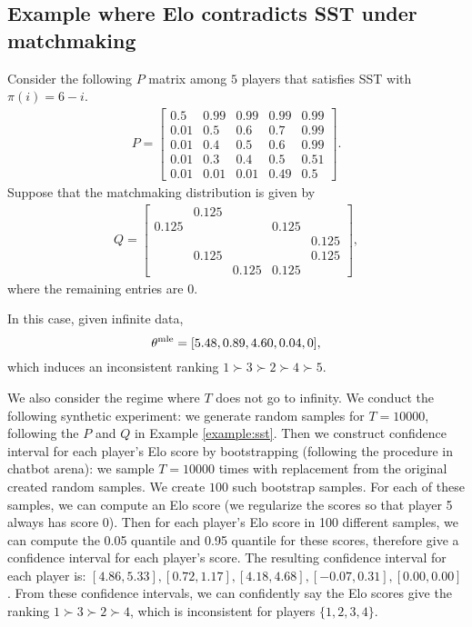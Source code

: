 \subsection{Example where Elo contradicts SST under matchmaking}
\begin{example}
\label{example:sst}
Consider the following $P$ matrix among $5$ players that satisfies SST with $\pi(i)=6-i$.
\begin{align*}
P=\left[
\begin{matrix}
0.5 & 0.99 & 0.99 & 0.99 & 0.99\\
0.01 & 0.5 & 0.6 & 0.7 & 0.99 \\
0.01 & 0.4 & 0.5 & 0.6 & 0.99 \\
0.01 & 0.3& 0.4 & 0.5 & 0.51 \\
0.01 & 0.01 & 0.01 & 0.49 & 0.5
\end{matrix}
\right].
\end{align*}
Suppose that the matchmaking distribution is given by
\begin{align*}
Q=\left[
\begin{matrix}
 &  0.125&  &  & \\
0.125 &  & & 0.125 &  \\
 &  &  &  &  0.125 \\
 & 0.125 &  & & 0.125  \\
 &  & 0.125  &0.125  &
\end{matrix}
\right],
\end{align*}
where the remaining entries are $0$.
\end{example}

In this case, given infinite data,
\[
\theta^{\rm mle} = [5.48, 0.89, 4.60, 0.04, 0],
\]
which induces an inconsistent ranking $1\succ 3\succ 2\succ 4\succ 5$. 


We also consider the regime where $T$ does not go to infinity. We conduct the following synthetic experiment: we generate random samples for $T=10000$,  following the $P$ and $Q$ in Example \ref{example:sst}. Then we construct confidence interval for each player's Elo score by bootstrapping (following the procedure in chatbot arena): we sample $T=10000$ times with replacement from the original created random samples. We create $100$ such bootstrap samples. For each of these samples, we can compute an Elo score (we regularize the scores so that player 5 always has score 0). Then for each player's Elo score in 100 different samples, we can compute the 0.05 quantile and 0.95 quantile for these scores, therefore give a confidence interval for each player's score. The resulting confidence interval for each player is:
$[4.86,5.33], [0.72,1.17], [4.18,4.68], [-0.07,0.31], [0.00,0.00]$. From these confidence intervals, we can confidently say the Elo scores give the ranking $1\succ 3\succ 2\succ 4$, which is inconsistent for players $\{1,2,3,4\}$.
